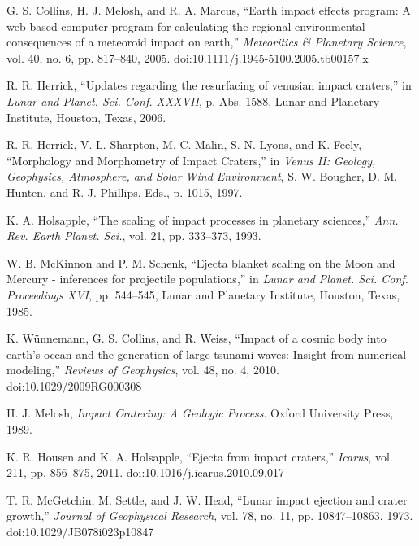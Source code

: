 \documentclass[conference]{IEEEtran}
\begin{document}
\begin{thebibliography}{00}

    G. S. Collins, H. J. Melosh, and R. A. Marcus, ``Earth impact effects program: A web-based computer program for calculating the regional environmental consequences of a meteoroid impact on earth,'' \textit{Meteoritics \& Planetary Science}, vol. 40, no. 6, pp. 817--840, 2005. doi:10.1111/j.1945-5100.2005.tb00157.x

    R. R. Herrick, ``Updates regarding the resurfacing of venusian impact craters,'' in \textit{Lunar and Planet. Sci. Conf. XXXVII}, p. Abs. 1588, Lunar and Planetary Institute, Houston, Texas, 2006.

    R. R. Herrick, V. L. Sharpton, M. C. Malin, S. N. Lyons, and K. Feely, ``Morphology and Morphometry of Impact Craters,'' in \textit{Venus II: Geology, Geophysics, Atmosphere, and Solar Wind Environment}, S. W. Bougher, D. M. Hunten, and R. J. Phillips, Eds., p. 1015, 1997.

    K. A. Holsapple, ``The scaling of impact processes in planetary sciences,'' \textit{Ann. Rev. Earth Planet. Sci.}, vol. 21, pp. 333--373, 1993.

    W. B. McKinnon and P. M. Schenk, ``Ejecta blanket scaling on the Moon and Mercury - inferences for projectile populations,'' in \textit{Lunar and Planet. Sci. Conf. Proceedings XVI}, pp. 544--545, Lunar and Planetary Institute, Houston, Texas, 1985.

    K. Wünnemann, G. S. Collins, and R. Weiss, ``Impact of a cosmic body into earth’s ocean and the generation of large tsunami waves: Insight from numerical modeling,'' \textit{Reviews of Geophysics}, vol. 48, no. 4, 2010. doi:10.1029/2009RG000308
    
    H. J. Melosh, \textit{Impact Cratering: A Geologic Process}. Oxford University Press, 1989.

    K. R. Housen and K. A. Holsapple, ``Ejecta from impact craters,'' \textit{Icarus}, vol. 211, pp. 856--875, 2011. doi:10.1016/j.icarus.2010.09.017

    T. R. McGetchin, M. Settle, and J. W. Head, ``Lunar impact ejection and crater growth,'' \textit{Journal of Geophysical Research}, vol. 78, no. 11, pp. 10847--10863, 1973. doi:10.1029/JB078i023p10847


\end{thebibliography}
\end{document}
